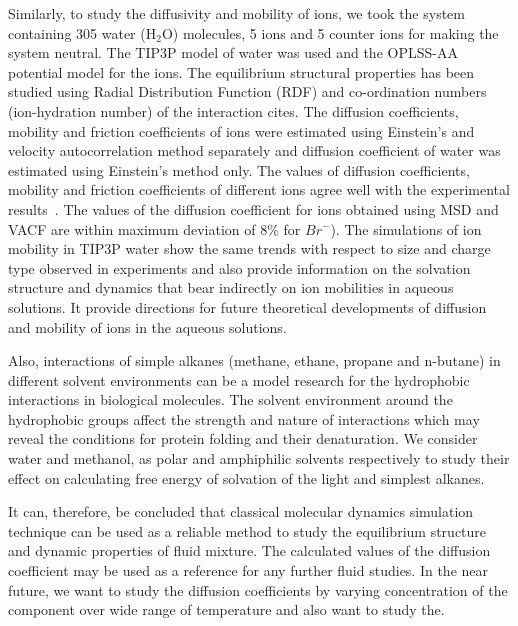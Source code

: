  Similarly, to study the diffusivity and  mobility of ions, we took the system containing 305 water (H$_\mathrm{2}$O) molecules, 5 ions   and 5 counter ions for making the system neutral. The TIP3P  model of water was used and the OPLSS-AA  potential model for the ions. The equilibrium  structural properties has been studied using Radial  Distribution Function (RDF) and co-ordination numbers (ion-hydration number) of the interaction cites.  The diffusion coefficients, mobility and friction coefficients of ions were estimated  using Einstein's and velocity autocorrelation method separately and diffusion coefficient of  water was estimated using Einstein's method only. The values of diffusion coefficients, mobility and friction coefficients  of different ions  agree well with the experimental
 results~\citep{lide2009crc}. The values of the diffusion coefficient for ions obtained using MSD and VACF are within maximum deviation of  8$\%$ for $Br^-$). The  simulations of ion mobility in TIP3P water show the same trends with respect to size and charge type observed in  experiments and also provide information on the solvation structure and dynamics that bear indirectly on ion mobilities in
 aqueous solutions. It  provide  directions for future theoretical developments of diffusion and  mobility  of ions in the aqueous solutions. 

Also, interactions of simple alkanes (methane, ethane, propane  and n-butane) in different solvent environments can be a model research for the hydrophobic interactions  in biological molecules. The solvent environment around the hydrophobic groups affect the strength and nature of interactions which may reveal the conditions for protein folding and their denaturation. We consider water and  methanol,  as polar and amphiphilic  solvents respectively to study their effect on calculating free energy of solvation of the light and simplest alkanes.   

 It can, therefore, be concluded that classical molecular dynamics simulation technique can be used as a reliable method to study the equilibrium structure and dynamic properties of fluid mixture. The calculated values of the diffusion coefficient may be used as a reference for any further fluid studies. In the near future, we want to study the diffusion coefficients by varying concentration of the component over wide range of temperature and also want to study the.  
 
